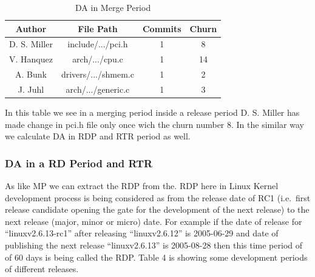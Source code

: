 \documentclass{acm_proc_article-sp}
\begin{document}
\begin{table}[ht]
\caption{DA in Merge Period}  %
\centering 						%
\begin{tabular}{c c c c}				%
\hline\hline						%
Author		& File Path			& Commits		& Churn \\ [0.5ex]
\hline 							%
D. S. Miller	& include/.../pci.h		& 1				& 8 \\
V. Hanquez	& arch/.../cpu.c		& 1				& 14 \\
A. Bunk		& drivers/.../shmem.c	& 1				& 2 \\
J. Juhl		& arch/.../generic.c		& 1				& 3 \\
[1ex]							%
\hline 							%
\end{tabular}
\label{table:nonlin} 				%
\end{table}

In this table we see in a merging period inside a release period D. S. Miller has made change in pci.h file only once wich the churn number 8. In the similar way we calculate DA in RDP and RTR period as well.

\subsubsection{DA in a RD Period and RTR}
As like MP we can extract the RDP from the. RDP here in Linux Kernel development process is being considered as from the release date of RC1 (i.e.\ first release candidate opening the gate for the development of the next release) to the next release (major, minor or micro) date. For example if the date of release for ``linuxv2.6.13-rc1'' after releasing ``linuxv2.6.12''  is 2005-06-29 and date of publishing the next release ``linuxv2.6.13'' is 2005-08-28 then this time period of of 60 days is being called the RDP. Table 4 is showing some development periods of different releases.
\end{document}
